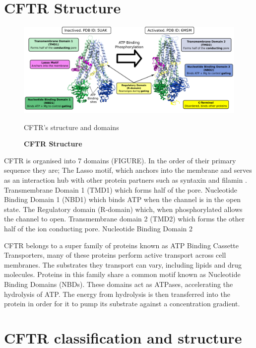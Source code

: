 \section{CFTR Structure}

\begin{figure}
	\begin{center}
	\includegraphics[width=\textwidth]{figures/CFTR_structure.pdf}
	\end{center}
	\captionsetup{singlelinecheck = false, justification=raggedright}
	\caption[CFTR Structure] {\textbf{CFTR Structure}}{CFTR's structure and domains } 
\end{figure}
CFTR is organised into 7 domains (FIGURE). In the order of their primary sequence they are; The Lasso motif, which anchors into the membrane and serves as an interaction hub with other protein partners such as syntaxin and filamin \cite{}. Transmembrane Domain 1 (TMD1) which forms half of the pore. Nucleotide Binding Domain 1 (NBD1) which binds ATP when the channel is in the open state. The Regulatory domain (R-domain) which, when phosphorylated allows the channel to open. Transmembrane domain 2 (TMD2) which forms the other half of the ion conducting pore. Nucleotide Binding Domain 2 

CFTR belongs to a super family of proteins known as ATP Binding Cassette Transporters,  many of these proteins perform active transport across cell membranes. The substrates they transport can vary, including lipids and drug molecules. Proteins in this family share a common motif known as Nucleotide Binding Domains (NBDs). These domains act as ATPases, accelerating the hydrolysis of ATP. The energy from hydrolysis is then transferred into the protein in order for it to pump its substrate against a concentration gradient. 

\section{CFTR classification and structure}

